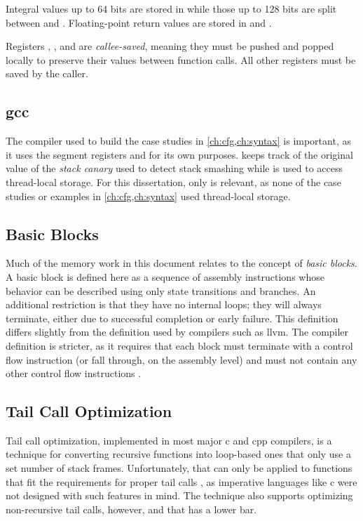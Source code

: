 Integral values up to 64 bits are stored in  while those up to 128 bits
are split between  and .
Floating-point return values are stored in  and .

Registers , , and  are
\emph{callee-saved}, meaning they must be pushed and popped locally to preserve their
values between function calls. All other registers must be saved by the caller.

\subsection{\Ac{gcc}}
The compiler used to build the case studies in \cref{ch:cfg,ch:syntax} is important,
as it uses the segment registers  and  for its own purposes.
 keeps track of the original value of the \emph{stack canary}
used to detect stack smashing \autocite{cowan1998stackguard}
while  is used to access thread-local storage.
For this dissertation, only  is relevant, as none of the case studies
or examples in \cref{ch:cfg,ch:syntax} used thread-local storage.

\subsection{Basic Blocks}
Much of the memory work in this document relates to the concept of \emph{basic blocks}.%
A basic block is defined here as a sequence of assembly instructions
whose behavior can be described using only state transitions and branches.
An additional restriction is that they have no internal loops;
they will always terminate, either due to successful completion or early failure.
This definition differs slightly from the definition used by compilers such as \gls{llvm}.
The compiler definition is stricter, as it requires that
each block must terminate with a control flow instruction
(or fall through, on the assembly level)
and must not contain any other control flow instructions
\autocite{llvm:functions,llvm:terminators}.

\subsection{Tail Call Optimization}
Tail call%
optimization, implemented in most major \gls{c} and \gls{cpp} compilers, is a technique
for converting recursive functions into loop-based ones that only use
a set number of stack frames.
Unfortunately, that can only be applied to functions that fit the requirements
for proper tail calls \autocite{probst2001proper},
as imperative languages like \gls{c} were not designed with such features in mind.
The technique also supports optimizing non-recursive tail calls, however,
and that has a lower bar.

